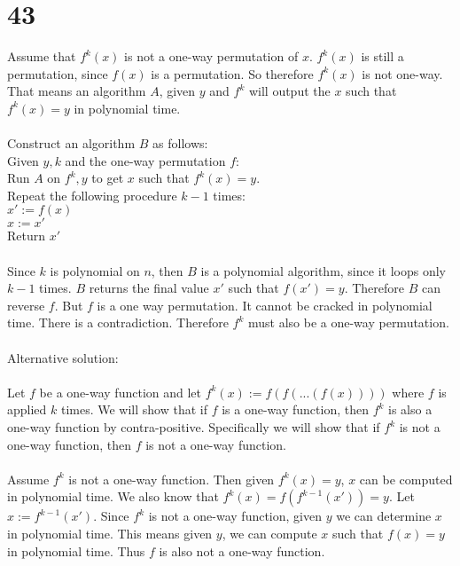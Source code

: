 \documentclass[letterpaper,notitlepage,twoside]{article}
\newcommand\tab[1][1cm]{\hspace*{#1}} %
\begin{document}
\section*{43}
Assume that $f^k(x)$ is not a one-way permutation of $x$. $f^k(x)$ is still a permutation, since $f(x)$ is a permutation. So therefore $f^k(x)$ is not one-way. That means an algorithm $A$, given $y$ and $f^k$ will output the $x$ such that $f^k(x) = y$ in polynomial time. \\\\
Construct an algorithm $B$ as follows: \\
Given $y, k$ and the one-way permutation $f$: \\
\tab Run $A$ on $f^k, y$ to get $x$ such that $f^k(x) = y$. \\
\tab Repeat the following procedure $k - 1$ times: \\
\tab\tab $x' := f(x)$ \\
\tab\tab $x := x'$ \\
\tab Return $x'$ \\\\
Since $k$ is polynomial on $n$, then $B$ is a polynomial algorithm, since it loops only $k - 1$ times. $B$ returns the final value $x'$ such that $f(x') = y$. Therefore $B$ can reverse $f$. But $f$ is a one way permutation. It cannot be cracked in polynomial time. There is a contradiction. Therefore $f^k$ must also be a one-way permutation.
\\\\
Alternative solution:
\\\\
Let $f$ be a one-way function and let $f^k(x) := f(f(...(f(x))))$ where $f$ is applied $k$ times. We will show that if $f$ is a one-way function, then $f^k$ is also a one-way function by contra-positive. Specifically we will show that if $f^k$ is not a one-way function, then $f$ is not a one-way function.
\\\\
Assume $f^k$ is not a one-way function. Then given $f^k(x) = y$, $x$ can be computed in polynomial time. We also know that $ f^k(x) = f(f^{k-1}(x')) = y$. Let $x := f^{k-1}(x')$. Since $f^k$ is not a one-way function, given $y$ we can determine $x$ in polynomial time. This means given $y$, we can compute $x$ such that $f(x) = y$ in polynomial time. Thus $f$ is also not a one-way function.
\end{document}
